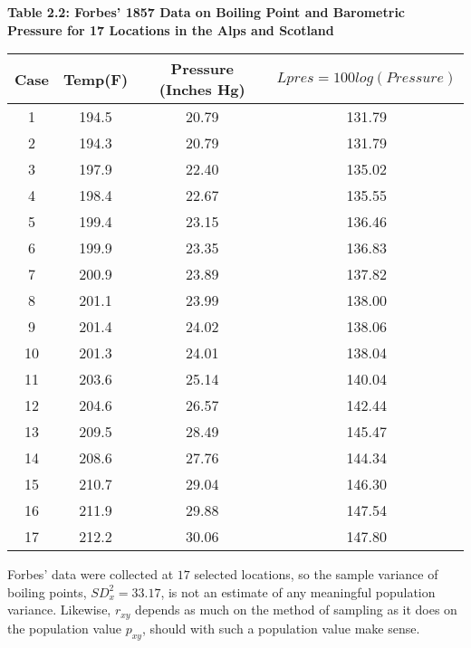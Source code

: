 \documentclass{article}
\begin{document}
    \begin{center}
        \textbf{Table 2.2: Forbes’ 1857 Data on Boiling Point and Barometric Pressure for 17 Locations in the Alps and Scotland}
        
        \begin{tabular}{|cccc|}
            \hline 
            Case & Temp(F) & Pressure (Inches Hg) & ${Lpres=100log(Pressure)}$ \\
            \hline
            1 & 194.5 & 20.79 & 131.79 \\
            2 & 194.3 & 20.79 & 131.79 \\
            3 & 197.9 & 22.40 & 135.02 \\
            4 & 198.4 & 22.67 & 135.55 \\
            5 & 199.4 & 23.15 & 136.46 \\ 
            6 & 199.9 & 23.35 & 136.83 \\
            7 & 200.9 & 23.89 & 137.82 \\
            8 & 201.1 & 23.99 & 138.00 \\ 
            9 & 201.4 & 24.02 & 138.06 \\
            10 & 201.3 & 24.01 & 138.04 \\
            11 & 203.6 & 25.14 & 140.04 \\
            12 & 204.6 & 26.57 & 142.44 \\
            13 & 209.5 & 28.49 & 145.47 \\
            14 & 208.6 & 27.76 & 144.34 \\
            15 & 210.7 & 29.04 & 146.30 \\
            16 & 211.9 & 29.88 & 147.54 \\
            17 & 212.2 & 30.06 & 147.80 \\
            \hline
        \end{tabular}
    \end{center}
    
    Forbes’ data were collected at $17$ selected locations, so the sample variance of boiling points, ${SD^2_{x} = 33.17}$, is not an estimate of any meaningful population variance. Likewise, \textit{${r_{xy}}$} depends as much on the method of sampling as it does on the population value \textit{${p_{xy}}$}, should with such a population value make sense. 
    
\end{document}
